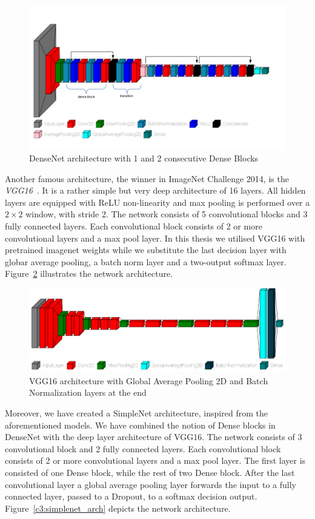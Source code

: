 \begin{figure}[h!]
    \centering  
    \includegraphics[width=.7\textwidth]{figures/chap3/cnn/architectures/densenet_arch}
    \caption{DenseNet architecture with 1 and 2 consecutive Dense Blocks}
    \label{c3:densenet_arch}
\end{figure}

Another famous architecture, the winner in ImageNet Challenge 2014, is the \textit{VGG16}~\cite{simonyan2014very}. It is a rather simple but very deep architecture of 16 layers. All hidden layers are equipped with ReLU non-linearity and max pooling is performed over a $2\times2$ window, with stride 2.
The network consists of 5 convolutional blocks and 3 fully connected layers. Each convolutional block consists of 2 or more convolutional layers and a max pool layer. 
In this thesis we utilised VGG16 with pretrained imagenet weights while we substitute the last decision layer with globar average pooling, a batch norm layer and a two-output softmax layer.
Figure~\ref{c3:vgg_arch} illustrates the network architecture.

\begin{figure}[h!]
    \centering  
    \includegraphics[width=.7\textwidth]{figures/chap3/cnn/architectures/vgg_arch}
    \caption{VGG16 architecture with Global Average Pooling 2D and Batch Normalization layers at the end}
    \label{c3:vgg_arch}
\end{figure}

Moreover, we have created a SimpleNet architecture, inspired from the aforementioned models. We have combined the notion of Dense blocks in DenseNet with the deep layer architecture of VGG16. The network consists of 3 convolutional block and 2 fully connected layers. Each convolutional block consists of 2 or more convolutional layers and a max pool layer. The first layer is consisted of one Dense block, while the rest of two Dense block. After the last convolutional layer a global average pooling layer forwards the input to a fully connected layer, passed to a Dropout, to a softmax decision output.
Figure~\ref{c3:simplenet_arch} depicts the network architecture.

